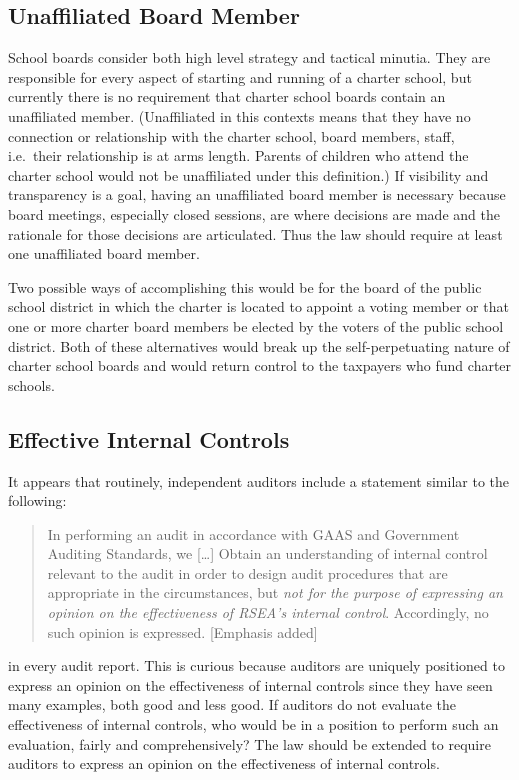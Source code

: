 \subsection{Unaffiliated Board Member}\indent%
\label{sec:unaff-board-memb}\indent%

School boards consider both high level strategy and tactical minutia. They are responsible for every aspect of starting and running of a charter school, but currently there is no requirement that charter school boards contain an unaffiliated member. (Unaffiliated in this contexts means that they have no connection or relationship with the charter school, board members, staff, i.e.\ their relationship is at arms length. Parents of children who attend the charter school would not be unaffiliated under this definition.) If visibility and transparency is a goal, having an unaffiliated board member is necessary because board meetings, especially closed sessions, are where decisions are made and the rationale for those decisions are articulated. Thus the law should require at least one unaffiliated board member.

Two possible ways of accomplishing this would be for the board of the public school district in which the charter is located to appoint a voting member or that one or more charter board members be elected by the voters of the public school district. Both of these alternatives would break up the self-perpetuating nature of charter school boards and would return control to the taxpayers who fund charter schools.

\subsection{Effective Internal Controls}%
\label{sec:effect-intern-contr}\indent%

It appears that routinely, independent auditors include a statement similar to the following:
\begin{quotation}\noindent
  In performing an audit in accordance with GAAS and Government Auditing Standards, we [\ldots]
  Obtain an understanding of internal control relevant to the audit in order to design audit procedures that are appropriate in the circumstances, but \textit{not for the purpose of expressing an opinion on the effectiveness of RSEA’s internal control}. Accordingly, no such opinion is expressed. [Emphasis added]
\end{quotation}
in every audit report. This is curious because auditors are uniquely positioned to express an opinion on the effectiveness of internal controls since they have seen many examples, both good and less good. If auditors do not evaluate the effectiveness of internal controls, who would be in a position to perform such an evaluation, fairly and comprehensively? The law should be extended to require auditors to express an opinion on the effectiveness of internal controls.

